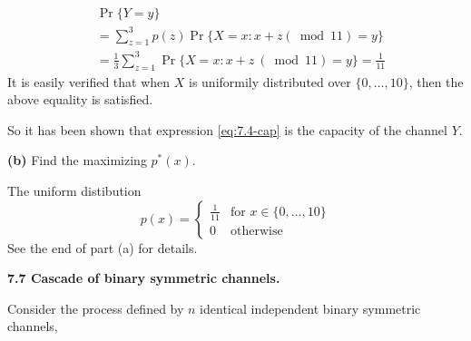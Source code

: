 \documentclass[10pt]{article}
\newcommand{\setbrace}[1]{{\{#1\}}}
\begin{document}
\begin{tiny}
\begin{multicols}{3}
\begin{align*}
    &\Pr \setbrace{Y=y} \\
    &= \sum_{z=1}^{3}p(z) \Pr \setbrace{X=x : x+z (\bmod 11) = y} \\
    &= \frac{1}{3}\sum_{z=1}^{3} \Pr \setbrace{X = x : x+z\ (\bmod 11) = y} = \frac{1}{11}
\end{align*}
It is easily verified that when $X$ is uniformily distributed over
$\setbrace{0,\dots,10}$, then the above equality is satisfied.

So it has been shown that expression \ref{eq:7.4-cap} is the capacity of
the channel $Y$.

\textbf{(b)} Find the maximizing $p^*(x)$.

The uniform distibution
\begin{equation*}
    p(x)= \begin{cases}
        \frac{1}{11} & \text{for $x \in \setbrace{0,\dots,10}$} \\
        0 & \text{otherwise}
    \end{cases}
\end{equation*}
See the end of part (a) for details.

\textbf{\scriptsize 7.7 Cascade of binary symmetric channels.}

Consider the process defined by $n$ identical independent binary symmetric
channels,


\end{multicols}
\end{tiny}
\end{document}
